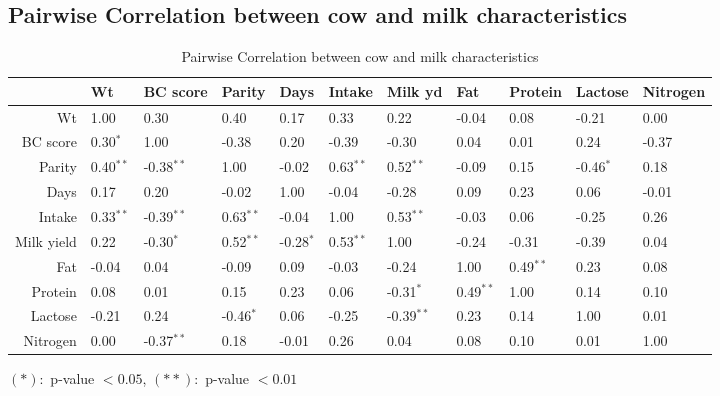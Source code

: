 \subsection*{Pairwise Correlation between cow and milk characteristics}
\begin{table}[H]
\begin{tabular}{rllllllllll}
 \hline
 		& Wt 		& BC score 	& Parity 	& Days 		& Intake 	& Milk yd 	& Fat 		& Protein 	& Lactose 	& Nitrogen \\ 
 \hline
  Wt 		& 1.00 		& 0.30 		& 0.40 		& 0.17 		& 0.33 		& 0.22 		& -0.04 	& 0.08 		& -0.21 	& 0.00 \\ 
  BC score 	& 0.30$^{*}$ 	& 1.00 		& -0.38 	& 0.20 		& -0.39 	& -0.30 	& 0.04 		& 0.01 		& 0.24 		& -0.37 \\ 
  Parity 	& 0.40$^{**}$ 	& -0.38$^{**}$ 	& 1.00 		& -0.02 	& 0.63$^{**}$ 	& 0.52$^{**}$ 	& -0.09 	& 0.15 		& -0.46$^{*}$ 	& 0.18 \\ 
  Days 		& 0.17 		& 0.20 		& -0.02 	& 1.00 		& -0.04 	& -0.28 	& 0.09 		& 0.23 		& 0.06 		& -0.01 \\ 
  Intake 	& 0.33$^{**}$ 	& -0.39$^{**}$ 	& 0.63$^{**}$ 	& -0.04 	& 1.00 		& 0.53$^{**}$ 	& -0.03 	& 0.06 		& -0.25 	& 0.26 \\ 
  Milk yield 	& 0.22 		& -0.30$^{*}$ 	& 0.52$^{**}$ 	& -0.28$^{*}$ 	& 0.53$^{**}$ 	& 1.00 		& -0.24 	& -0.31 	& -0.39 	& 0.04 \\ 
  Fat 		& -0.04 	& 0.04 		& -0.09 	& 0.09 		& -0.03 	& -0.24 	& 1.00 		& 0.49$^{**}$ 	& 0.23 		& 0.08 \\ 
  Protein 	& 0.08 		& 0.01 		& 0.15 		& 0.23 		& 0.06 		& -0.31$^{*}$ 	& 0.49$^{**}$ 	& 1.00 		& 0.14 		& 0.10 \\ 
  Lactose 	& -0.21 	& 0.24 		& -0.46$^{*}$ 	& 0.06 		& -0.25 	& -0.39$^{**}$ 	& 0.23 		& 0.14 		& 1.00 		& 0.01 \\ 
  Nitrogen 	& 0.00 		& -0.37$^{**}$ 	& 0.18 		& -0.01 	& 0.26 		& 0.04 		& 0.08 		& 0.10 		& 0.01 		& 1.00 \\ 
  \hline
\end{tabular}
{\footnotesize $(*): $ p-value $< 0.05$, $(**): $ p-value $< 0.01$}
\caption{Pairwise Correlation between cow and milk characteristics}
\label{tab:corr_cow}
\end{table}


